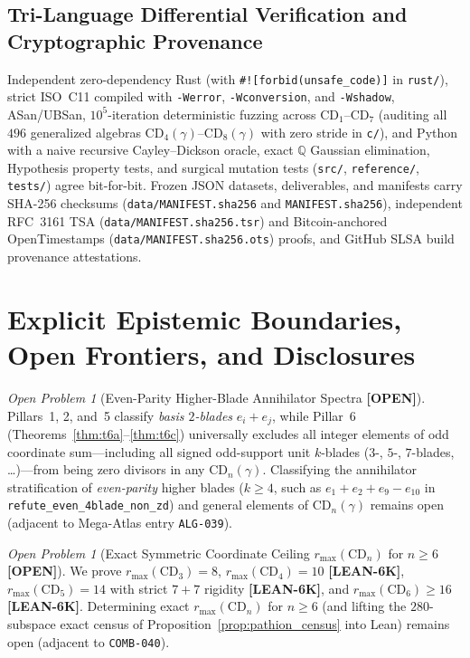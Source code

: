 \documentclass[11pt,reqno]{amsart}
\newcommand{\code}[1]{\textnormal{\texttt{\small\nolinkurl{#1}}}}
\newcommand{\cmd}[1]{\textnormal{\texttt{\small #1}}}
\theoremstyle{plain}
\theoremstyle{definition}
\theoremstyle{remark}
\newtheorem{openproblem}[theorem]{Open Problem}
\newcommand{\tagLean}{\mbox{\textsf{\textbf{\color{oiBlue}[LEAN-6K]}}}}
\newcommand{\tagOpen}{\mbox{\textsf{\textbf{\color{oiVerm}[OPEN]}}}}
\newcommand{\CD}{\mathrm{CD}}
\newcommand{\Q}{\mathbb{Q}}
\begin{document}
\subsection{Tri-Language Differential Verification and Cryptographic Provenance}
Independent zero-dependency Rust (with \cmd{\#![forbid(unsafe\_code)]} in \cmd{rust/}), strict
ISO~C11 compiled with \cmd{-Werror}, \cmd{-Wconversion}, and \cmd{-Wshadow}, ASan/UBSan,
$10^5$-iteration deterministic fuzzing across $\CD_1$--$\CD_7$ (auditing all $496$ generalized
algebras $\CD_4(\gamma)$--$\CD_8(\gamma)$ with zero stride in \cmd{c/}), and Python with a naive
recursive Cayley--Dickson oracle, exact $\Q$ Gaussian elimination, Hypothesis property tests, and
surgical mutation tests (\cmd{src/}, \cmd{reference/}, \cmd{tests/}) agree bit-for-bit. Frozen JSON
datasets, deliverables, and manifests carry SHA-256 checksums (\code{data/MANIFEST.sha256} and
\code{MANIFEST.sha256}), independent RFC~3161 TSA (\code{data/MANIFEST.sha256.tsr}) and
Bitcoin-anchored OpenTimestamps (\code{data/MANIFEST.sha256.ots}) proofs, and GitHub SLSA build
provenance attestations.

\section{Explicit Epistemic Boundaries, Open Frontiers, and Disclosures}
\label{sec:boundaries}

\begin{openproblem}[Even-Parity Higher-Blade Annihilator Spectra \tagOpen]
Pillars~1, 2, and~5 classify \emph{basis $2$-blades} $e_i + e_j$, while Pillar~6
(Theorems~\ref{thm:t6a}--\ref{thm:t6c}) universally excludes all integer elements of odd
coordinate sum---including all signed odd-support unit $k$-blades ($3$-, $5$-, $7$-blades, \dots)---from
being zero divisors in any $\CD_n(\gamma)$. Classifying the annihilator stratification of
\emph{even-parity} higher blades ($k \ge 4$, such as $e_1 + e_2 + e_9 - e_{10}$ in
\code{refute_even_4blade_non_zd}) and general elements of $\CD_n(\gamma)$ remains open (adjacent
to Mega-Atlas entry \code{ALG-039}).
\end{openproblem}

\begin{openproblem}[Exact Symmetric Coordinate Ceiling $r_{\max}(\CD_n)$ for $n \ge 6$ \tagOpen]
We prove $r_{\max}(\CD_3) = 8$, $r_{\max}(\CD_4) = 10$ \tagLean{}, $r_{\max}(\CD_5) = 14$ with
strict $7+7$ rigidity \tagLean{}, and $r_{\max}(\CD_6) \ge 16$ \tagLean{}. Determining exact
$r_{\max}(\CD_n)$ for $n \ge 6$ (and lifting the $280$-subspace exact census of
Proposition~\ref{prop:pathion_census} into Lean) remains open (adjacent to \code{COMB-040}).
\end{openproblem}
\end{document}
